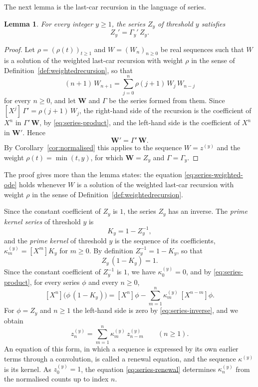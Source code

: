 \documentclass{amsart}
\newtheorem{lemma}[theorem]{Lemma}
\theoremstyle{definition}
\theoremstyle{remark}
\numberwithin{equation}{section}
\begin{document}
The next lemma is the last-car recursion in the language of series.

\begin{lemma}\label{lem:seriesode}
For every integer $y\ge1$, the series $Z_y$ of threshold $y$ satisfies
\[
Z_y'=\Gamma_y'\,Z_y .
\]
\end{lemma}

\begin{proof}
Let $\rho=(\rho(t))_{t\ge1}$ and $W=(W_n)_{n\ge0}$ be real sequences such
that $W$ is a solution of the weighted last-car recursion with weight $\rho$
in the sense of Definition~\ref{def:weightedrecursion}, so that
\[
(n+1)\,W_{n+1}=\sum_{j=0}^{n}\rho(j+1)\,W_j\,W_{n-j}
\]
for every $n\ge0$, and let $\mathbf W$ and $\Gamma$ be the series formed from
them. Since $[X^j]\,\Gamma'=\rho(j+1)\,W_j$, the right-hand side of the
recursion is the coefficient of $X^n$ in $\Gamma'\,\mathbf W$, by
\eqref{eq:series-product}, and the left-hand side is the coefficient of $X^n$
in $\mathbf W'$. Hence
\begin{equation}\label{eq:series-weighted-ode}
\mathbf W'=\Gamma'\,\mathbf W .
\end{equation}
By Corollary~\ref{cor:normalised} this applies to the sequence $W=z^{(y)}$ and
the weight $\rho(t)=\min(t,y)$, for which $\mathbf W=Z_y$ and
$\Gamma=\Gamma_y$.
\end{proof}

The proof gives more than the lemma states: the equation
\eqref{eq:series-weighted-ode} holds whenever $W$ is a solution of the
weighted last-car recursion with weight $\rho$ in the sense of
Definition~\ref{def:weightedrecursion}.

Since the constant coefficient of $Z_y$ is $1$, the series $Z_y$ has an
inverse. The \emph{prime kernel series} of threshold $y$ is
\[
K_y=1-Z_y^{-1},
\]
and the \emph{prime kernel} of threshold $y$ is the sequence of its
coefficients, $\kappa^{(y)}_m=[X^m]K_y$ for $m\ge0$. By definition
$Z_y^{-1}=1-K_y$, so that
\begin{equation}\label{eq:series-inverse}
Z_y\,(1-K_y)=1 .
\end{equation}
Since the
constant coefficient of $Z_y^{-1}$ is $1$, we have $\kappa^{(y)}_0=0$, and
by \eqref{eq:series-product}, for every series $\phi$ and every $n\ge0$,
\begin{equation}\label{eq:series-kernel-product}
[X^n]\bigl(\phi\,(1-K_y)\bigr)
=[X^n]\phi-\sum_{m=1}^{n}\kappa^{(y)}_m\,[X^{n-m}]\phi .
\end{equation}
For $\phi=Z_y$ and $n\ge1$ the left-hand side is zero by
\eqref{eq:series-inverse}, and we obtain
\begin{equation}\label{eq:series-renewal}
z^{(y)}_n=\sum_{m=1}^{n}\kappa^{(y)}_m\,z^{(y)}_{n-m}\qquad(n\ge1).
\end{equation}
An equation of this form, in which a sequence is expressed by its own earlier
terms through a convolution, is called a renewal equation, and the sequence
$\kappa^{(y)}$ is its kernel. As $z^{(y)}_0=1$, the equation
\eqref{eq:series-renewal} determines $\kappa^{(y)}_n$ from the normalised
counts up to index $n$.
\end{document}
